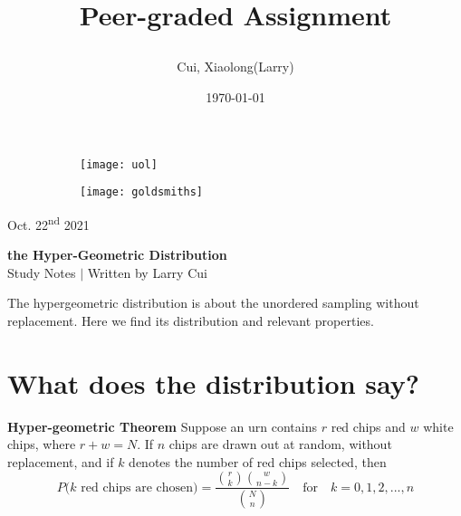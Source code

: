 \documentclass[11pt]{article}
\title{\vspace{-90pt} 



\textbf  {Peer-graded Assignment} }
\author{Cui, Xiaolong(Larry)}
\date{\today}
\begin{document}

\thispagestyle{plain}


\begin{figure}[H] %
  \begin{subfigure}{0.3\textwidth}
    \texttt{[image: uol]}
  \end{subfigure}
  \hfill
  \begin{subfigure}{0.3\textwidth}
    \texttt{[image: goldsmiths]}
  \end{subfigure}
\end{figure}


\begin{flushright}
\footnotesize {Oct. 22\textsuperscript{nd} 2021}
\end{flushright}

\begin{center}
\textbf{the Hyper-Geometric Distribution} \\
\footnotesize {Study Notes $ | $ Written by Larry Cui}
\end{center}





\setcounter{figure}{0}

\vspace{10pt}


The hypergeometric distribution is about the unordered sampling without replacement.   Here we find its distribution and relevant properties. 


\section{\normalsize What does the distribution say?}


\begin{tcolorbox}[
	enhanced, 
	width=\textwidth, 
	fontupper=\normalsize,%
	drop fuzzy shadow southwest,
	boxrule=0.4pt,
	sharp corners,
	colframe=yellow!80!black,
	colback=yellow!10]
	
\textbf{\color{RoyalBlue} Hyper-geometric Theorem} \quad Suppose an urn contains $r$ red chips and $w$ white chips, where $r+w=N$.  If $n$ chips are drawn out at random, without replacement, and if $k$ denotes the number of red chips selected, then
\[ 
P \text{($k$ red chips are chosen)}  = \frac{\displaystyle  \binom {r}{k} \binom {w}{n-k}} {\displaystyle \binom {N}{n}} \quad \text{for} \quad k=0,1,2,...,n
\]

\end{tcolorbox}
\end{document}

